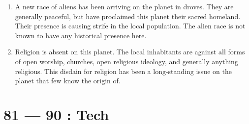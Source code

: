 \documentclass{article}
\begin{document}
\begin{enumerate}
	\item A new race of aliens has been arriving on the planet in droves. They are generally peaceful, but have proclaimed this planet their sacred homeland. Their presence is causing strife in the local population. The alien race is not known to have any historical presence here.
	\item Religion is absent on this planet. The local inhabitants are against all forms of open worship, churches, open religious ideology, and generally anything religious. This disdain for religion has been a long-standing issue on the planet that few know the origin of.
\end{enumerate}
\section*{81 --- 90 : Tech}
\end{document}
